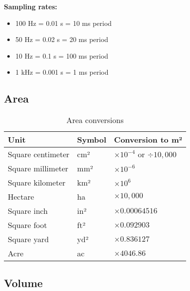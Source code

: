\textbf{Sampling rates:}
\begin{itemize}
    \item 100 Hz = 0.01 s = 10 ms period
    \item 50 Hz = 0.02 s = 20 ms period
    \item 10 Hz = 0.1 s = 100 ms period
    \item 1 kHz = 0.001 s = 1 ms period
\end{itemize}

\subsection{Area}

\begin{table}[H]
\centering
\begin{tabular}{|l|l|l|}
\hline
\rowcolor{blue!20}
\textbf{Unit} & \textbf{Symbol} & \textbf{Conversion to m²} \\
\hline
Square centimeter & cm² & $\times 10^{-4}$ or $\div 10{,}000$ \\
\hline
Square millimeter & mm² & $\times 10^{-6}$ \\
\hline
Square kilometer & km² & $\times 10^{6}$ \\
\hline
Hectare & ha & $\times 10{,}000$ \\
\hline
\rowcolor{yellow!20}
Square inch & in² & $\times 0.00064516$ \\
\hline
\rowcolor{yellow!20}
Square foot & ft² & $\times 0.092903$ \\
\hline
\rowcolor{yellow!20}
Square yard & yd² & $\times 0.836127$ \\
\hline
\rowcolor{yellow!20}
Acre & ac & $\times 4046.86$ \\
\hline
\end{tabular}
\caption{Area conversions}
\end{table}

\subsection{Volume}

